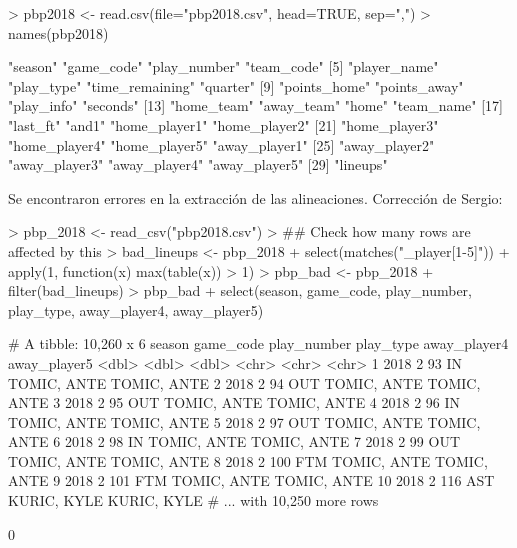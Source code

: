 \documentclass[paper=a4, fontsize=9pt]{article}
\begin{document}
\begin{Schunk}
\begin{Sinput}
> pbp2018 <- read.csv(file="pbp2018.csv", head=TRUE, sep=",")
> names(pbp2018)
\end{Sinput}
\begin{Soutput}
 [1] "season"         "game_code"      "play_number"    "team_code"     
 [5] "player_name"    "play_type"      "time_remaining" "quarter"       
 [9] "points_home"    "points_away"    "play_info"      "seconds"       
[13] "home_team"      "away_team"      "home"           "team_name"     
[17] "last_ft"        "and1"           "home_player1"   "home_player2"  
[21] "home_player3"   "home_player4"   "home_player5"   "away_player1"  
[25] "away_player2"   "away_player3"   "away_player4"   "away_player5"  
[29] "lineups"       
\end{Soutput}
\end{Schunk}

Se encontraron errores en la extracción de las alineaciones. Corrección de Sergio:

\begin{Schunk}
\begin{Sinput}
> pbp_2018 <- read_csv("pbp2018.csv")
> ## Check how many rows are affected by this
> bad_lineups <- pbp_2018 %
+   select(matches("_player[1-5]")) %
+   apply(1, function(x) max(table(x)) > 1)
> pbp_bad <- pbp_2018 %
+   filter(bad_lineups)
> pbp_bad %
+   select(season, game_code, play_number, play_type, away_player4, away_player5)
\end{Sinput}
\begin{Soutput}
# A tibble: 10,260 x 6
   season game_code play_number play_type away_player4 away_player5
    <dbl>     <dbl>       <dbl> <chr>     <chr>        <chr>       
 1   2018         2          93 IN        TOMIC, ANTE  TOMIC, ANTE 
 2   2018         2          94 OUT       TOMIC, ANTE  TOMIC, ANTE 
 3   2018         2          95 OUT       TOMIC, ANTE  TOMIC, ANTE 
 4   2018         2          96 IN        TOMIC, ANTE  TOMIC, ANTE 
 5   2018         2          97 OUT       TOMIC, ANTE  TOMIC, ANTE 
 6   2018         2          98 IN        TOMIC, ANTE  TOMIC, ANTE 
 7   2018         2          99 OUT       TOMIC, ANTE  TOMIC, ANTE 
 8   2018         2         100 FTM       TOMIC, ANTE  TOMIC, ANTE 
 9   2018         2         101 FTM       TOMIC, ANTE  TOMIC, ANTE 
10   2018         2         116 AST       KURIC, KYLE  KURIC, KYLE 
# ... with 10,250 more rows
\end{Soutput}
\begin{Soutput}
[1] 0
\end{Soutput}
\end{Schunk}
\end{document}
